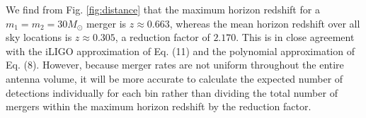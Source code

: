 \documentclass{article}
\begin{document}
We find from Fig. \ref{fig:distance} that the maximum horizon redshift for a $m_1=m_2=30 M_\odot$ merger is $z \approx 0.663$, whereas the mean horizon redshift over all sky locations is $z \approx 0.305$, a reduction factor of $2.170$. This is in close agreement with the iLIGO approximation of Eq. (11) and the polynomial approximation of Eq. (8). However, because merger rates are not uniform throughout the entire antenna volume, it will be more accurate to calculate the expected number of detections individually for each bin rather than dividing the total number of mergers within the maximum horizon redshift by the reduction factor. 
\end{document}
